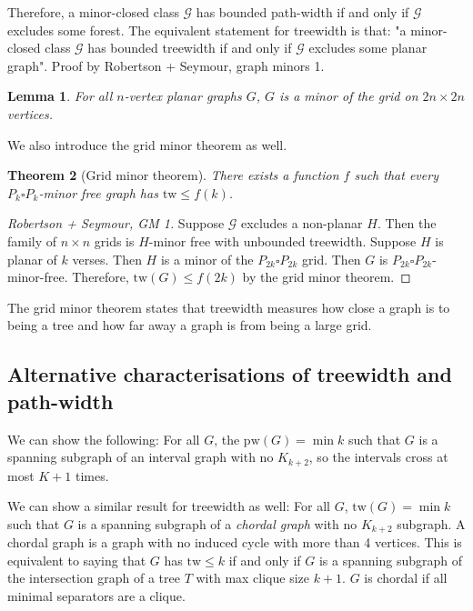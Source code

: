 \documentclass[]{article}
\newcommand{\tw}{\text{tw}}
\newcommand{\pw}{\text{pw}}
\newtheorem{theorem}{Theorem}
\newtheorem{lemma}[theorem]{Lemma}
\theoremstyle{definition}
\numberwithin{theorem}{section}
\numberwithin{equation}{section}
\begin{document}
Therefore, a minor-closed class $\mathcal{G}$ has bounded path-width if and only if $\mathcal{G}$ excludes some forest. The equivalent statement for treewidth is that: 
"a minor-closed class $\mathcal{G}$ has bounded treewidth if and only if $\mathcal{G}$ excludes some planar graph". Proof by Robertson + Seymour, graph minors 1.
\begin{lemma}
	For all $n$-vertex planar graphs $G$, $G$ is a minor of the grid on $2n \times 2n$ vertices.
\end{lemma}
We also introduce the grid minor theorem as well.
\begin{theorem}[Grid minor theorem]
	There exists a function $f$ such that every $P_k \square P_k$-minor free graph has $\tw \leq f(k)$. 
\end{theorem}
\begin{proof}[Robertson + Seymour, GM 1]
	Suppose $\mathcal{G}$ excludes a non-planar $H$. Then the family of $n \times n$ grids is $H$-minor free with unbounded treewidth.
	Suppose $H$ is planar of $k$ verses. Then $H$ is a minor of the $P_{2k} \square P_{2k}$ grid. Then $G$ is $P_{2k} \square P_{2k}$-minor-free. Therefore, $\tw(G) \leq f(2k)$ by the grid minor theorem. 
\end{proof}

The grid minor theorem states that treewidth measures how close a graph is to being a tree and how far away a graph is from being a large grid. 
\subsection{Alternative characterisations of treewidth and path-width}
We can show the following:
For all $G$, the $\pw(G) = \min k$ such that $G$ is a spanning subgraph of an interval graph with no $K_{k + 2}$, so the intervals cross at most $K + 1$ times. 

We can show a similar result for treewidth as well:
For all $G$, $\tw(G) = \min k$ such that $G$ is a spanning subgraph of a \textit{chordal graph} with no $K_{k + 2}$ subgraph. A chordal graph is a graph with no induced cycle with more than 4 vertices. This is equivalent to saying that $G$ has $\tw \leq k$ if and only if $G$ is a spanning subgraph of the intersection graph of a tree $T$ with max clique size $k + 1$. 
$G$ is chordal if all minimal separators are a clique. 
\end{document}
